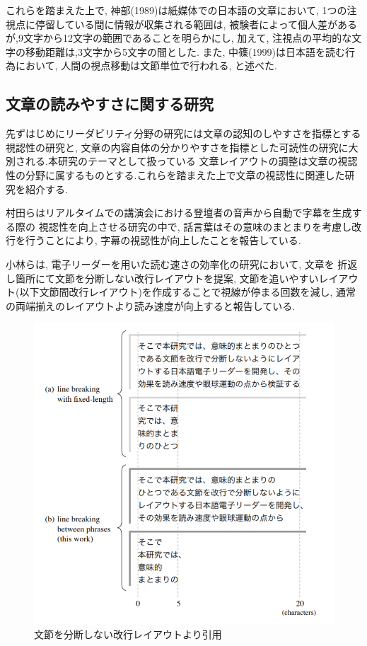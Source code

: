 これらを踏まえた上で, 神部(1989)は紙媒体での日本語の文章において, 1つの注視点に停留している間に情報が収集される範囲は,
被験者によって個人差があるが,9文字から12文字の範囲であることを明らかにし, 
加えて, 注視点の平均的な文字の移動距離は,3文字から5文字の間とした.\cite{神部89}
また, 中篠(1999)は日本語を読む行為において, 人間の視点移動は文節単位で行われる, と述べた.\cite{中條99} 

\subsection{文章の読みやすさに関する研究}

先ずはじめにリーダビリティ分野の研究には文章の認知のしやすさを指標とする視認性の研究と,
文章の内容自体の分かりやすさを指標とした可読性の研究に大別される.本研究のテーマとして扱っている
文章レイアウトの調整は文章の視認性の分野に属するものとする.これらを踏まえた上で文章の視認性に関連した研究を紹介する.

村田らはリアルタイムでの講演会における登壇者の音声から自動で字幕を生成する際の
視認性を向上させる研究の中で, 話言葉はその意味のまとまりを考慮し改行を行うことにより, 
字幕の視認性が向上したことを報告している.\cite{村田09} 

小林らは, 電子リーダーを用いた読む速さの効率化の研究において, 文章を
折返し箇所にて文節を分断しない改行レイアウトを提案, 
文節を追いやすいレイアウト(以下文節間改行レイアウト)を作成することで視線が停まる回数を減し, 
通常の両端揃えのレイアウトより読み速度が向上すると報告している.\cite{小林14} 

\begin{figure}[H]
    \centering
    \label{fig:layout}
    \includegraphics[width=0.6\columnwidth]{image/02/img1.png}
    \caption[文節を分断しない改行レイアウト] {文節を分断しない改行レイアウト\protect\cite{小林14}より引用}
\end{figure}

